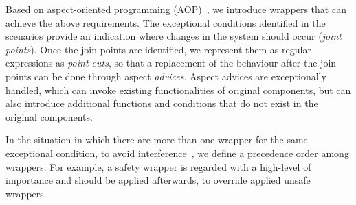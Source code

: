 Based on aspect-oriented programming (AOP)~\cite{Kiczales:2001}, we introduce wrappers that can achieve the above requirements. The exceptional conditions identified in the scenarios provide an indication where changes in the system should occur ({\it joint points}). Once the join points are identified, we represent them as regular expressions as {\it point-cuts}, so that a replacement of the behaviour after the join points can be done through aspect {\it advices}. Aspect advices are exceptionally handled, which can invoke existing functionalities of original components, but can also introduce additional functions and conditions that do not exist in the original components.




In the situation in which there are more than one wrapper for the same exceptional condition, to avoid interference~\cite{Katz:2008:IAI:1394496.1394500}, we define a precedence order among wrappers. For example, a safety wrapper is regarded with a high-level of importance and should be applied afterwards, to override applied unsafe wrappers. 

